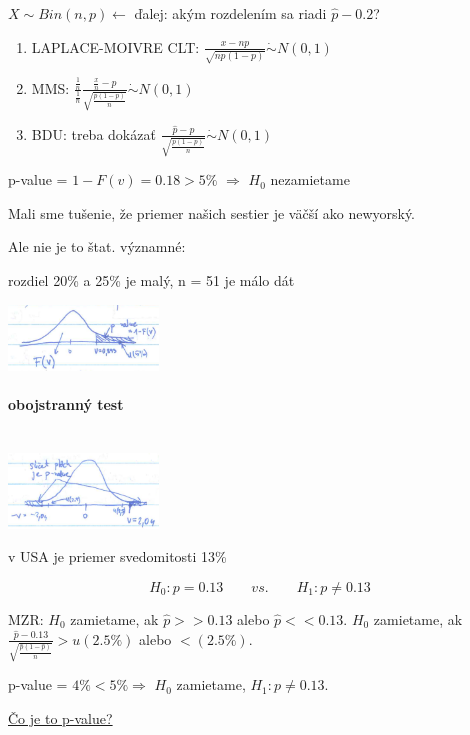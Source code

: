 \documentclass[unknownkeysallowed]{article}
\begin{document}
$X \sim Bin(n,p) \leftarrow$ ďalej: akým rozdelením sa riadi $\hat{p}-0.2$?
\begin{enumerate}
\item LAPLACE-MOIVRE CLT: $\frac{x-np}{\sqrt{np(1-p)}} \dot{\sim} N(0,1)$
\item MMS: $\frac{\frac{1}{n}}{\frac{1}{n}}\frac{\frac{x}{n}-p}{\sqrt{\frac{p(1-p)}{n}}} \dot{\sim} N(0,1)$
\item BDU: treba dokázať $\frac{\hat{p}-p}{\sqrt{\frac{p(1-p)}{n}}} \dot{\sim} N(0,1)$
\end{enumerate}

\begin{multicols}{2}
p-value = $1-F(v) = 0.18 > 5\%$ $\Rightarrow$ $H_0$ nezamietame

Mali sme tušenie, že priemer našich sestier je väčší ako newyorský.

Ale nie je to štat. významné:

rozdiel 20\% a 25\% je malý, n = 51 je málo dát

\columnbreak
\includegraphics[width=0.3\textwidth]{imgs/obr21.png}
\end{multicols}

\paragraph*{obojstranný test}~\\

\includegraphics[width=0.3\textwidth]{imgs/obr22.png}

v USA je priemer svedomitosti 13\%

$$H_0: p = 0.13 \qquad vs. \qquad H_1: p \neq 0.13$$

MZR: $H_0$ zamietame, ak $\hat{p} >> 0.13$ alebo $\hat{p} << 0.13$. $H_0$ zamietame, ak $\frac{\hat{p}-0.13}{\sqrt{\frac{\hat{p}(1-\hat{p})}{n}}} > u(2.5\%)$ alebo $ < (2.5\%)$.

p-value = $4\% < 5\% \Rightarrow $ $H_0$ zamietame, $H_1: p \neq 0.13$.

\underline{Čo je to p-value?}
\end{document}
